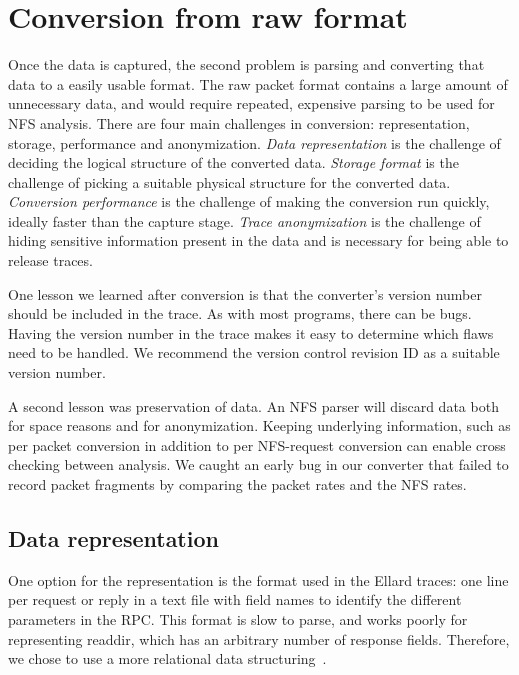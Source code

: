\section{Conversion from raw format}
\label{sec:conversion}

Once the data is captured, the second problem is parsing and
converting that data to a easily usable format.  The raw packet format
contains a large amount of unnecessary data, and would require
repeated, expensive parsing to be used for NFS analysis.  There are four main
challenges in conversion: representation, storage, performance and
anonymization.  {\it Data representation} is the challenge of deciding the
logical structure of the converted data.  {\it Storage format} is the challenge of
picking a suitable physical structure for the converted data.
{\it Conversion performance} is the challenge of making the conversion run quickly,
ideally faster than the capture stage.  {\it Trace anonymization} is the
challenge of hiding sensitive information present in the data and is
necessary for being able to release traces.

One lesson we learned after conversion is that the converter's version
number should be included in the trace.  As with most programs, there
can be bugs.  Having the version number in the trace makes it easy to
determine which flaws need to be handled.  We recommend the version
control revision ID as a suitable version number.  

A second lesson was
preservation of data.  An NFS parser will discard data both for space
reasons and for anonymization.  Keeping underlying information, such as
per packet conversion in addition to per NFS-request conversion can
enable cross checking between analysis.  We caught an early bug in our
converter that failed to record packet fragments by comparing the
packet rates and the NFS rates.  

\subsection{Data representation}

One option for the representation is the format used in the
Ellard\cite{ellardTraces} traces: one line per request or reply in a text
file with field names to identify the different parameters in the RPC.
This format is slow to parse, and works poorly for representing 
readdir, which has an arbitrary number of response fields.
Therefore, we chose to use a more relational data
structuring~\cite{codd70relational}.  

